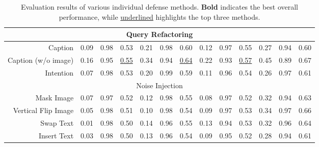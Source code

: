 \begin{table*}[ht]
{\begin{tabular}{r|cccccc|cccccc}
        \midrule
        \multicolumn{13}{c}{Query Refactoring} \\
        \midrule
        Caption              & 0.09  & 0.98  & 0.53  & 0.21  & 0.98  & 0.60  & 0.12  & 0.97  & 0.55  & 0.27  & 0.94  & 0.60  \\
        Caption (w/o image)  & 0.16  & 0.95  & \underline{0.55}  & 0.34  & 0.94  & \underline{0.64}  & 0.22  & 0.93  & \underline{0.57}  & 0.45  & 0.89  & 0.67  \\
        Intention            & 0.07  & 0.98  & 0.53  & 0.20  & 0.99  & 0.59  & 0.11  & 0.96  & 0.54  & 0.26  & 0.97  & 0.61  \\
        \midrule
        \multicolumn{13}{c}{Noise Injection} \\
        \midrule
        Mask Image           & 0.07  & 0.97  & 0.52  & 0.12  & 0.98  & 0.55  & 0.08  & 0.97  & 0.52  & 0.32  & 0.94  & 0.63 \\
        Vertical Flip Image  & 0.05  & 0.98  & 0.51  & 0.10  & 0.98  & 0.54  & 0.09  & 0.97  & 0.53  & 0.34  & 0.97  & 0.66 \\
        Swap Text            & 0.01  & 0.98  & 0.50  & 0.14  & 0.96  & 0.55  & 0.13  & 0.94  & 0.53  & 0.32  & 0.96  & 0.64 \\
        Insert Text          & 0.03  & 0.98  & 0.50  & 0.13  & 0.96  & 0.54  & 0.09  & 0.95  & 0.52  & 0.28  & 0.94  & 0.61  \\
        \bottomrule
    \end{tabular}}
    \caption{Evaluation results of various individual defense methods. \textbf{Bold} indicates the best overall performance, while \underline{underlined} highlights the top three methods.} %
    \label{tab:indi_results}
\end{table*}
